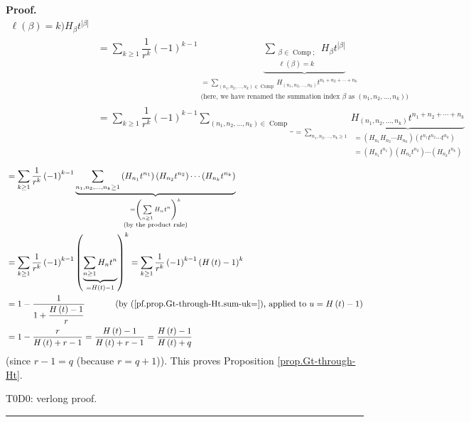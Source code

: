 \documentclass[numbers=enddot,12pt,final,onecolumn,notitlepage]{scrartcl}%
\theoremstyle{definition}
\newenvironment{proof}[1][Proof]{\noindent\textbf{#1.} }{\ \rule{0.5em}{0.5em}}
\let\sumnonlimits\sum
\renewcommand{\sum}{\sumnonlimits\limits}
\newenvironment{verlong}{}{}
\begin{document}
\begin{proof}
\begin{align*}
{{\ell\left(  \beta\right)  =k\text{)}}}H_{\beta}t^{\left\vert \beta\right\vert
}\\
&  =\sum_{k\geq1}\dfrac{1}{r^{k}}\left(  -1\right)  ^{k-1}\underbrace{\sum
_{\substack{\beta\in\operatorname*{Comp};\\\ell\left(  \beta\right)
=k}}H_{\beta}t^{\left\vert \beta\right\vert }}_{\substack{=\sum_{\left(
n_{1},n_{2},\ldots,n_{k}\right)  \in\operatorname*{Comp}}H_{\left(
n_{1},n_{2},\ldots,n_{k}\right)  }t^{n_{1}+n_{2}+\cdots+n_{k}}\\\text{(here,
we have renamed the summation index }\beta\text{ as }\left(  n_{1}%
,n_{2},\ldots,n_{k}\right)  \text{)}}}\\
&  =\sum_{k\geq1}\dfrac{1}{r^{k}}\left(  -1\right)  ^{k-1}\underbrace{\sum
_{\left(  n_{1},n_{2},\ldots,n_{k}\right)  \in\operatorname*{Comp}}}%
_{=\sum_{n_{1},n_{2},\ldots,n_{k}\geq1}}\underbrace{H_{\left(  n_{1}%
,n_{2},\ldots,n_{k}\right)  }t^{n_{1}+n_{2}+\cdots+n_{k}}}_{\substack{=\left(
H_{n_{1}}H_{n_{2}}\cdots H_{n_{k}}\right)  \left(  t^{n_{1}}t^{n_{2}}\cdots
t^{n_{k}}\right)  \\=\left(  H_{n_{1}}t^{n_{1}}\right)  \left(  H_{n_{2}%
}t^{n_{2}}\right)  \cdots\left(  H_{n_{k}}t^{n_{k}}\right)  }}
\end{align*}%
\begin{align*}
&  =\sum_{k\geq1}\dfrac{1}{r^{k}}\left(  -1\right)  ^{k-1}\underbrace{\sum
_{n_{1},n_{2},\ldots,n_{k}\geq1}\left(  H_{n_{1}}t^{n_{1}}\right)  \left(
H_{n_{2}}t^{n_{2}}\right)  \cdots\left(  H_{n_{k}}t^{n_{k}}\right)
}_{\substack{=\left(  \sum_{n\geq1}H_{n}t^{n}\right)  ^{k}\\\text{(by the
product rule)}}}\\
&  =\sum_{k\geq1}\dfrac{1}{r^{k}}\left(  -1\right)  ^{k-1}\left(
\underbrace{\sum_{n\geq1}H_{n}t^{n}}_{=H\left(  t\right)  -1}\right)
^{k}=\sum_{k\geq1}\dfrac{1}{r^{k}}\left(  -1\right)  ^{k-1}\left(  H\left(
t\right)  -1\right)  ^{k}\\
&  =1-\dfrac{1}{1+\dfrac{H\left(  t\right)  -1}{r}}\ \ \ \ \ \ \ \ \ \ \left(
\text{by (\ref{pf.prop.Gt-through-Ht.sum-uk=}), applied to }u=H\left(
t\right)  -1\right) \\
&  =1-\dfrac{r}{H\left(  t\right)  +r-1}=\dfrac{H\left(  t\right)
-1}{H\left(  t\right)  +r-1}=\dfrac{H\left(  t\right)  -1}{H\left(  t\right)
+q}%
\end{align*}
(since $r-1=q$ (because $r=q+1$)). This proves Proposition
\ref{prop.Gt-through-Ht}. \qedhere


\begin{verlong}
T0D0: verlong proof.
\end{verlong}
\end{proof}
\end{document}
